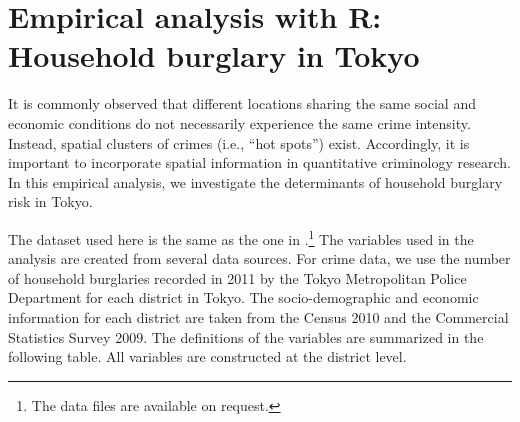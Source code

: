 \documentclass[10.5pt, A4paper, openany, uplatex]{book}
\numberwithin{equation}{section}
\begin{document}
\section{Empirical analysis with \textbf{R}: Household burglary in Tokyo}\label{sec:emp_burglar}

It is commonly observed that different locations sharing the same social and economic conditions do not necessarily experience the same crime intensity.
Instead, spatial clusters of crimes (i.e., ``hot spots'') exist.
Accordingly, it is important to incorporate spatial information in quantitative criminology research.
In this empirical analysis, we investigate the determinants of household burglary risk in Tokyo.

The dataset used here is the same as the one in \cite{hoshino2018semiparametric}.\footnote{
	The data files are available on request.
}
The variables used in the analysis are created from several data sources.
For crime data, we use the number of household burglaries recorded in 2011 by the Tokyo Metropolitan Police Department for each district in Tokyo.
The socio-demographic and economic information for each district are taken from the Census 2010 and the Commercial Statistics Survey 2009.
The definitions of the variables are summarized in the following table.
All variables are constructed at the district level.
\end{document}
